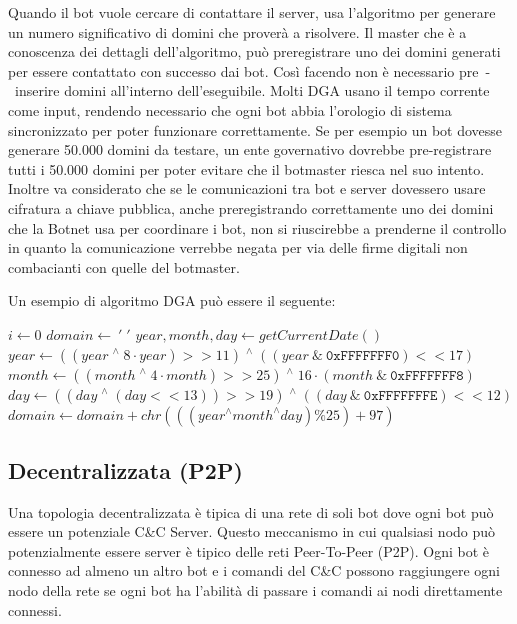 Quando il bot vuole cercare di contattare il server, usa l'algoritmo per generare un numero significativo di domini che proverà a risolvere. Il master che è a conoscenza dei dettagli dell'algoritmo, può preregistrare uno dei domini generati per essere contattato con successo dai bot.
Così facendo non è necessario pre~-~inserire domini all'interno dell'eseguibile.  Molti DGA usano il tempo corrente come input, rendendo necessario che ogni bot abbia l'orologio di sistema sincronizzato per poter funzionare correttamente. 
Se per esempio un bot dovesse generare 50.000 domini da testare, un ente governativo dovrebbe pre-registrare tutti i 50.000 domini per poter evitare che il botmaster riesca nel suo intento. Inoltre va considerato che se le comunicazioni tra bot e server dovessero usare cifratura a chiave pubblica, anche preregistrando correttamente uno dei domini che la Botnet usa per coordinare i bot, non si riuscirebbe a prenderne il controllo in quanto la comunicazione verrebbe negata per via delle firme digitali non combacianti con quelle del botmaster.

Un esempio di algoritmo DGA può essere il seguente:

\begin{algorithmic}[1]
    \State $i \gets 0$
    \State $domain \gets \:  '\;'$
    \State $year, month, day \gets getCurrentDate()$
        \State $year \gets ((year \; ^  \wedge \; 8 \cdot year) >> 11) \; ^\wedge \; ((year \: \& \: \texttt{0xFFFFFFF0}) << 17) $
        \State $month \gets ((month   \;^ \wedge \; 4 \cdot month) >> 25) \; ^ \wedge \; 16 \cdot (month \: \& 
 \: \texttt{0xFFFFFFF8}) $
        \State $day \gets ((day \;^ \wedge \;(day << 13)) >> 19) \;^\wedge \; ((day \:\& \:\texttt{0xFFFFFFFE}) << 12) $
        \State $domain \gets domain + chr(((year ^\wedge month ^\wedge day) \% 25) + 97) $
    \EndWhile
\end{algorithmic}

\subsection{Decentralizzata (P2P)}
\label{TopologiaDecentralizzata}
Una topologia decentralizzata è tipica di una rete di soli bot dove ogni bot può essere un potenziale C\&C Server. Questo meccanismo in cui qualsiasi nodo può potenzialmente essere server è tipico delle reti Peer-To-Peer (P2P).
Ogni bot è connesso ad almeno un altro bot e i comandi del C\&C possono raggiungere ogni nodo della rete se ogni bot ha l'abilità di passare i comandi ai nodi direttamente connessi.


